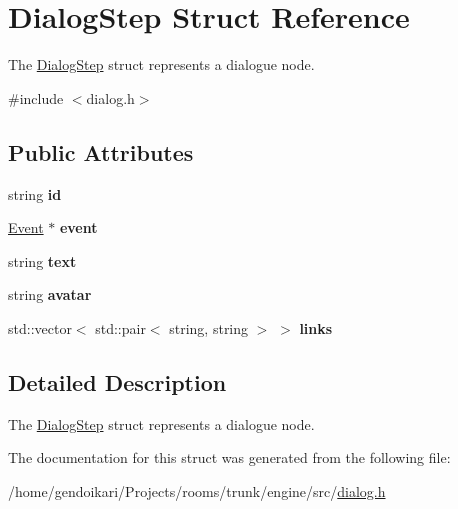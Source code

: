 \hypertarget{structDialogStep}{
\section{DialogStep Struct Reference}
\label{structDialogStep}
}


The \hyperlink{structDialogStep}{DialogStep} struct represents a dialogue node.  




{\ttfamily \#include $<$dialog.h$>$}

\subsection*{Public Attributes}
\begin{DoxyCompactItemize}
\item 
\hypertarget{structDialogStep_adaa0c913374e59923c43346c06acae14}{
string {\bfseries id}}
\label{structDialogStep_adaa0c913374e59923c43346c06acae14}

\item 
\hypertarget{structDialogStep_a4a54e542c6ed23f6d67fb52c847e627c}{
\hyperlink{classEvent}{Event} $\ast$ {\bfseries event}}
\label{structDialogStep_a4a54e542c6ed23f6d67fb52c847e627c}

\item 
\hypertarget{structDialogStep_a63d3be034b2b11d8aca765335ee2f374}{
string {\bfseries text}}
\label{structDialogStep_a63d3be034b2b11d8aca765335ee2f374}

\item 
\hypertarget{structDialogStep_a2a85f2a700db12c4a022f4f130e1781e}{
string {\bfseries avatar}}
\label{structDialogStep_a2a85f2a700db12c4a022f4f130e1781e}

\item 
\hypertarget{structDialogStep_a48c711c459999b3f22093b00fd79816c}{
std::vector$<$ std::pair$<$ string, string $>$ $>$ {\bfseries links}}
\label{structDialogStep_a48c711c459999b3f22093b00fd79816c}

\end{DoxyCompactItemize}


\subsection{Detailed Description}
The \hyperlink{structDialogStep}{DialogStep} struct represents a dialogue node. 

The documentation for this struct was generated from the following file:\begin{DoxyCompactItemize}
\item 
/home/gendoikari/Projects/rooms/trunk/engine/src/\hyperlink{dialog_8h}{dialog.h}\end{DoxyCompactItemize}
